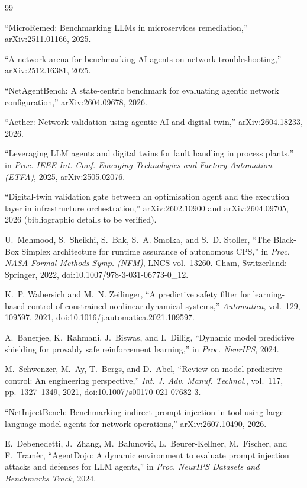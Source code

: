 \documentclass[conference]{IEEEtran}
\begin{document}
\begin{thebibliography}{99}

 ``MicroRemed: Benchmarking LLMs in microservices remediation,'' arXiv:2511.01166, 2025.

 ``A network arena for benchmarking AI agents on network troubleshooting,'' arXiv:2512.16381, 2025.

 ``NetAgentBench: A state-centric benchmark for evaluating agentic network configuration,'' arXiv:2604.09678, 2026.

 ``Aether: Network validation using agentic AI and digital twin,'' arXiv:2604.18233, 2026.

 ``Leveraging LLM agents and digital twins for fault handling in process plants,'' in \emph{Proc. IEEE Int. Conf. Emerging Technologies and Factory Automation (ETFA)}, 2025, arXiv:2505.02076.

 ``Digital-twin validation gate between an optimisation agent and the execution layer in infrastructure orchestration,'' arXiv:2602.10900 and arXiv:2604.09705, 2026 (bibliographic details to be verified).

 U.~Mehmood, S.~Sheikhi, S.~Bak, S.~A. Smolka, and S.~D. Stoller, ``The Black-Box Simplex architecture for runtime assurance of autonomous CPS,'' in \emph{Proc. NASA Formal Methods Symp. (NFM)}, LNCS vol.~13260. Cham, Switzerland: Springer, 2022, doi:10.1007/978-3-031-06773-0\_12.

 K.~P. Wabersich and M.~N. Zeilinger, ``A predictive safety filter for learning-based control of constrained nonlinear dynamical systems,'' \emph{Automatica}, vol.~129, 109597, 2021, doi:10.1016/j.automatica.2021.109597.

 A.~Banerjee, K.~Rahmani, J.~Biswas, and I.~Dillig, ``Dynamic model predictive shielding for provably safe reinforcement learning,'' in \emph{Proc. NeurIPS}, 2024.

 M.~Schwenzer, M.~Ay, T.~Bergs, and D.~Abel, ``Review on model predictive control: An engineering perspective,'' \emph{Int. J. Adv. Manuf. Technol.}, vol.~117, pp.~1327--1349, 2021, doi:10.1007/s00170-021-07682-3.

 ``NetInjectBench: Benchmarking indirect prompt injection in tool-using large language model agents for network operations,'' arXiv:2607.10490, 2026.

 E.~Debenedetti, J.~Zhang, M.~Balunovi\'c, L.~Beurer-Kellner, M.~Fischer, and F.~Tram\`er, ``AgentDojo: A dynamic environment to evaluate prompt injection attacks and defenses for LLM agents,'' in \emph{Proc. NeurIPS Datasets and Benchmarks Track}, 2024.


\end{thebibliography}
\end{document}

